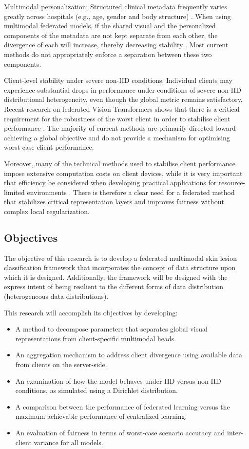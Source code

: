\documentclass{ieeeaccess}
\begin{document}
Multimodal personalization: Structured clinical metadata frequently varies greatly across hospitals (e.g., age, gender and body structure) \cite{Nunnari2020}. When using multimodal federated models, if the shared visual and the personalized components of the metadata are not kept separate from each other, the divergence of each will increase, thereby decreasing stability \cite{Zhu2025}. Most current methods do not appropriately enforce a separation between these two components.

Client-level stability under severe non-IID conditions: Individual clients may experience substantial drops in performance under conditions of severe non-IID distributional heterogeneity, even though the global metric remains satisfactory. Recent research on federated Vision Transformers shows that there is a critical requirement for the robustness of the worst client in order to stabilise client performance \cite{Darzi2024,Zhao2025}. The majority of current methods are primarily directed toward achieving a global objective and do not provide a mechanism for optimising worst-case client performance.

Moreover, many of the technical methods used to stabilise client performance impose extensive computation costs on client devices, while it is very important that efficiency be considered when developing practical applications for resource-limited environments \cite{Wu2024}. There is therefore a clear need for a federated method that stabilizes critical representation layers and improves fairness without complex local regularization.

\subsection{Objectives}

The objective of this research is to develop a federated multimodal skin lesion classification framework that incorporates the concept of data structure upon which it is designed. Additionally, the framework will be designed with the express intent of being resilient to the different forms of data distribution (heterogeneous data distributions).

This research will accomplish its objectives by developing:


\begin{itemize}
    \item A method to decompose parameters that separates global visual representations from client-specific multimodal heads.
    \item An aggregation mechanism to address client divergence using available data from clients on the server-side.
    \item An examination of how the model behaves under IID versus non-IID conditions, as simulated using a Dirichlet distribution.
    \item A comparison between the performance of federated learning versus the maximum achievable performance of centralized learning.
    \item An evaluation of fairness in terms of worst-case scenario accuracy and inter-client variance for all models.
\end{itemize}
\end{document}
